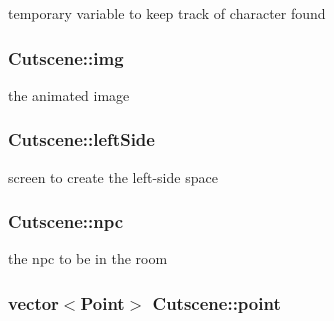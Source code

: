 temporary variable to keep track of character found 

\hypertarget{classCutscene_ae40582568add2f44e099d4a8978f41d4}{
\subsubsection[{img}]{ Cutscene\-::img\hspace{0.3cm}{\ttfamily [private]}}}\label{classCutscene_ae40582568add2f44e099d4a8978f41d4}


the animated image 

\hypertarget{classCutscene_aac25c81316f03b3c3caf0bdf735926bc}{
\subsubsection[{left\-Side}]{ Cutscene\-::left\-Side\hspace{0.3cm}{\ttfamily [private]}}}\label{classCutscene_aac25c81316f03b3c3caf0bdf735926bc}


screen to create the left-\/side space 

\hypertarget{classCutscene_a85778dff65358df7ddf7a77edeae9b7a}{
\subsubsection[{npc}]{ Cutscene\-::npc\hspace{0.3cm}{\ttfamily [private]}}}\label{classCutscene_a85778dff65358df7ddf7a77edeae9b7a}


the npc to be in the room 

\hypertarget{classCutscene_a7438465af0e7bc51d52ca5aaefc97e3b}{
\subsubsection[{point}]{\setlength{\rightskip}{0pt plus 5cm}vector$<${\bf Point}$>$ Cutscene\-::point\hspace{0.3cm}{\ttfamily [private]}}}\label{classCutscene_a7438465af0e7bc51d52ca5aaefc97e3b}


